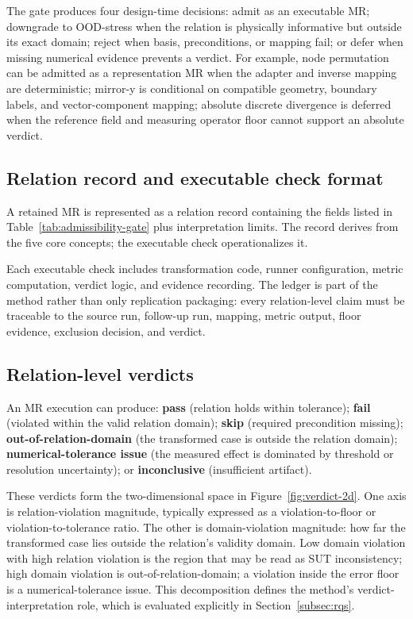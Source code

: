 \documentclass[preprint,12pt,authoryear]{elsarticle}
\begin{document}
The gate produces four design-time decisions: admit as an executable MR; downgrade to OOD-stress when the relation is physically informative but outside its exact domain; reject when basis, preconditions, or mapping fail; or defer when missing numerical evidence prevents a verdict. For example, node permutation can be admitted as a representation MR when the adapter and inverse mapping are deterministic; mirror-y is conditional on compatible geometry, boundary labels, and vector-component mapping; absolute discrete divergence is deferred when the reference field and measuring operator floor cannot support an absolute verdict.

\subsection{Relation record and executable check format}
\label{subsec:relation-record}

A retained MR is represented as a relation record containing the fields listed in Table~\ref{tab:admissibility-gate} plus interpretation limits. The record derives from the five core concepts; the executable check operationalizes it.

Each executable check includes transformation code, runner configuration, metric computation, verdict logic, and evidence recording. The ledger is part of the method rather than only replication packaging: every relation-level claim must be traceable to the source run, follow-up run, mapping, metric output, floor evidence, exclusion decision, and verdict.

\subsection{Relation-level verdicts}
\label{subsec:verdicts}

An MR execution can produce: \textbf{pass} (relation holds within tolerance); \textbf{fail} (violated within the valid relation domain); \textbf{skip} (required precondition missing); \textbf{out-of-relation-domain} (the transformed case is outside the relation domain); \textbf{numerical-tolerance issue} (the measured effect is dominated by threshold or resolution uncertainty); or \textbf{inconclusive} (insufficient artifact).

These verdicts form the two-dimensional space in Figure~\ref{fig:verdict-2d}. One axis is relation-violation magnitude, typically expressed as a violation-to-floor or violation-to-tolerance ratio. The other is domain-violation magnitude: how far the transformed case lies outside the relation's validity domain. Low domain violation with high relation violation is the region that may be read as SUT inconsistency; high domain violation is out-of-relation-domain; a violation inside the error floor is a numerical-tolerance issue. This decomposition defines the method's verdict-interpretation role, which is evaluated explicitly in Section~\ref{subsec:rqs}.
\end{document}
